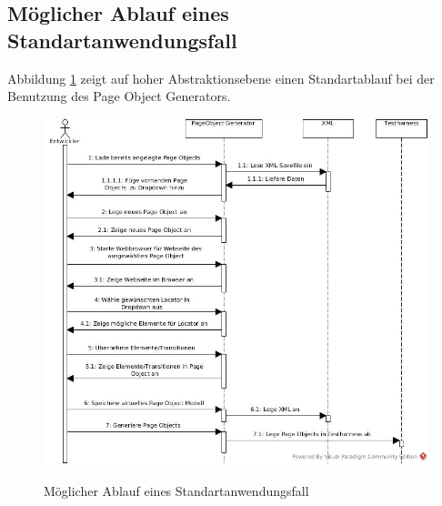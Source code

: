 \subsection{Möglicher Ablauf eines Standartanwendungsfall}
\label{sec:moeglicher_ablauf_eines_standartanwendungsfall}

Abbildung \ref{fig:sequenz} zeigt auf hoher Abstraktionsebene einen Standartablauf bei der Benutzung des Page Object Generators.



\begin{figure}[htb]
  \centering  
  \includegraphics[scale=0.5]{img/Sequenzdiagramm.jpg}\\
  \caption{Möglicher Ablauf eines Standartanwendungsfall}
  \label{fig:sequenz}
\end{figure}

